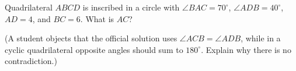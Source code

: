 Quadrilateral $ABCD$ is inscribed in a circle with $\angle BAC=70^\circ$, $\angle ADB=40^\circ$, $AD=4$, and $BC=6$. What is $AC$?

(A student objects that the official solution uses $\angle ACB=\angle ADB$, while in a cyclic quadrilateral opposite angles should sum to $180^\circ$. Explain why there is no contradiction.)
